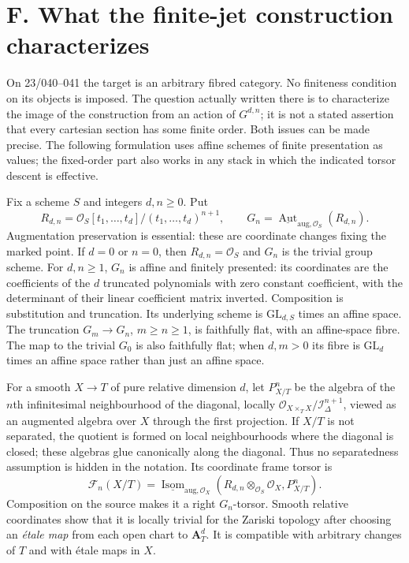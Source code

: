 \section{F. What the finite-jet construction characterizes}
\label{sec:geometry-F}

On 23/040--041 the target is an arbitrary fibred category. No finiteness
condition on its objects is imposed. The question actually written there is
to characterize the image of the construction from an action of
$G^{d,n}$; it is not a stated assertion that every cartesian section has some
finite order. Both issues can be made precise. The following formulation
uses affine schemes of finite presentation as values; the fixed-order part
also works in any stack in which the indicated torsor descent is effective.

Fix a scheme $S$ and integers $d,n\geq0$. Put
\[
 R_{d,n}=\mathcal O_S[t_1,\ldots,t_d]/(t_1,\ldots,t_d)^{n+1},\qquad
 G_n=\underline{\operatorname{Aut}}_{\mathrm{aug},\mathcal O_S}(R_{d,n}).
\]
Augmentation preservation is essential: these are coordinate changes fixing
the marked point. If $d=0$ or $n=0$, then $R_{d,n}=\mathcal O_S$ and
$G_n$ is the trivial group scheme. For $d,n\geq1$, $G_n$ is affine and finitely presented:
its coordinates are the coefficients of the $d$ truncated polynomials with
zero constant coefficient, with the determinant of their linear coefficient
matrix inverted. Composition is substitution and truncation. Its underlying
scheme is $\mathrm{GL}_{d,S}$ times an affine space. The truncation
$G_m\to G_n$, $m\geq n\geq1$, is faithfully flat, with an affine-space fibre.
The map to the trivial $G_0$ is also faithfully flat; when $d,m>0$ its
fibre is $\mathrm{GL}_{d}$ times an affine space rather than just an affine space.

For a smooth $X\to T$ of pure relative dimension $d$, let
$P^n_{X/T}$ be the algebra of the $n$th infinitesimal neighbourhood of
the diagonal, locally
$\mathcal O_{X\times_T X}/\mathcal I_\Delta^{n+1}$, viewed as an
augmented algebra over $X$ through the first projection. If $X/T$ is
not separated, the quotient is formed on local neighbourhoods where the
diagonal is closed; these algebras glue canonically along the diagonal.
Thus no separatedness assumption is hidden in the notation. Its coordinate
frame torsor is
\[
 \mathcal F_n(X/T)=
 \underline{\operatorname{Isom}}_{\mathrm{aug},\mathcal O_X}
 (R_{d,n}\otimes_{\mathcal O_S}\mathcal O_X,P^n_{X/T}).
\]
Composition on the source makes it a right $G_n$-torsor. Smooth relative
coordinates show that it is locally trivial for the Zariski topology after
choosing an \emph{\'etale map} from each open chart to $\mathbf A^d_T$.
It is compatible with arbitrary changes of $T$ and with \'{e}tale maps in $X$.

